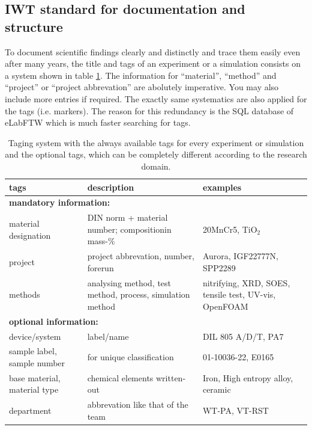 \subsection{IWT standard for documentation and structure}

To document scientific findings clearly and distinctly and trace them easily even after many years, the title and tags of an experiment or a simulation consists on a system shown in table \ref{table:tagging-system}. The information for ``material'', ``method'' and ``project'' or ``project abbrevation'' are abolutely imperative. You may also include more entries if required. The exactly same systematics are also applied for the tags (i.e. markers). The reason for this redundancy is the SQL database of eLabFTW which is much faster searching for tags.


\begin{table}[H]
 \centering
 \begin{tabular}{|p{5cm}|p{7cm}|p{3cm}|}
 \hline
 {\bf tags} & {\bf description} & {\bf examples} \\
 \hline
 \multicolumn{3}{|l|}{\bf mandatory information:} \\
 \hline
 material designation & DIN norm + material number; compositionin mass-\%  & 20MnCr5, TiO$_2$ \\ \hdashline
 project & project abbrevation, number, forerun& Aurora, IGF22777N, SPP2289 \\ \hdashline
 methods & analysing method, test method, process, simulation method & nitrifying, XRD, SOES, tensile test, UV-vis, OpenFOAM \\
 \hline
 \multicolumn{3}{|l|}{\bf optional information:} \\
 \hline
 device/system & label/name & DIL 805 A/D/T, PA7 \\ \hdashline
 sample label, sample number& for unique classification& 01-10036-22, E0165 \\ \hdashline
 base material, material type& chemical elements written-out& Iron, High entropy alloy, ceramic \\ \hdashline
 department & abbrevation like that of the team & WT-PA, VT-RST \\
 \hline
 \end{tabular}
 \caption{Taging system with the always available tags for every experiment or simulation and the optional tags, which can be completely different according to the research domain.}
\label{table:tagging-system}
\end{table}



